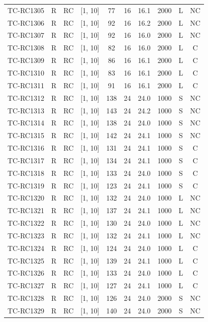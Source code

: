 \begin{longtable}{lccccccccc}
TC-RC1305 & R & RC & [1, 10] & 77 & 16 & 16.1 & 2000 & L & NC \\
TC-RC1306 & R & RC & [1, 10] & 92 & 16 & 16.2 & 2000 & L & NC \\
TC-RC1307 & R & RC & [1, 10] & 92 & 16 & 16.0 & 2000 & L & NC \\
TC-RC1308 & R & RC & [1, 10] & 82 & 16 & 16.0 & 2000 & L & C \\
TC-RC1309 & R & RC & [1, 10] & 86 & 16 & 16.1 & 2000 & L & C \\
TC-RC1310 & R & RC & [1, 10] & 83 & 16 & 16.1 & 2000 & L & C \\
TC-RC1311 & R & RC & [1, 10] & 91 & 16 & 16.1 & 2000 & L & C \\
TC-RC1312 & R & RC & [1, 10] & 138 & 24 & 24.0 & 1000 & S & NC \\
TC-RC1313 & R & RC & [1, 10] & 143 & 24 & 24.2 & 1000 & S & NC \\
TC-RC1314 & R & RC & [1, 10] & 138 & 24 & 24.0 & 1000 & S & NC \\
TC-RC1315 & R & RC & [1, 10] & 142 & 24 & 24.1 & 1000 & S & NC \\
TC-RC1316 & R & RC & [1, 10] & 131 & 24 & 24.1 & 1000 & S & C \\
TC-RC1317 & R & RC & [1, 10] & 134 & 24 & 24.1 & 1000 & S & C \\
TC-RC1318 & R & RC & [1, 10] & 133 & 24 & 24.0 & 1000 & S & C \\
TC-RC1319 & R & RC & [1, 10] & 123 & 24 & 24.1 & 1000 & S & C \\
TC-RC1320 & R & RC & [1, 10] & 132 & 24 & 24.0 & 1000 & L & NC \\
TC-RC1321 & R & RC & [1, 10] & 137 & 24 & 24.1 & 1000 & L & NC \\
TC-RC1322 & R & RC & [1, 10] & 130 & 24 & 24.0 & 1000 & L & NC \\
TC-RC1323 & R & RC & [1, 10] & 132 & 24 & 24.1 & 1000 & L & NC \\
TC-RC1324 & R & RC & [1, 10] & 124 & 24 & 24.0 & 1000 & L & C \\
TC-RC1325 & R & RC & [1, 10] & 139 & 24 & 24.1 & 1000 & L & C \\
TC-RC1326 & R & RC & [1, 10] & 133 & 24 & 24.0 & 1000 & L & C \\
TC-RC1327 & R & RC & [1, 10] & 127 & 24 & 24.1 & 1000 & L & C \\
TC-RC1328 & R & RC & [1, 10] & 126 & 24 & 24.0 & 2000 & S & NC \\
TC-RC1329 & R & RC & [1, 10] & 140 & 24 & 24.0 & 2000 & S & NC \\

\end{longtable}
